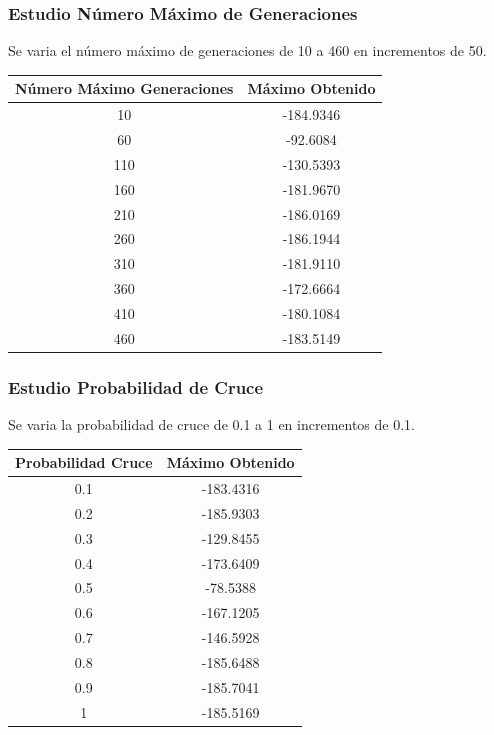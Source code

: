 \documentclass[12pt]{article}
\begin{document}
\subsubsection*{Estudio Número Máximo de Generaciones}
	Se varia el número máximo de generaciones de 10 a 460 en incrementos de 50.
\begin{table}[H]
\begin{center}
\begin{tabular}{|cc|} \hline
Número Máximo Generaciones & Máximo Obtenido \\  \hline
10  & -184.9346 \\ 
60  & -92.6084 \\ 
110 & -130.5393 \\
160 & -181.9670 \\
210 & -186.0169 \\
260 & -186.1944 \\
310 & -181.9110 \\
360 & -172.6664 \\ 
410 & -180.1084 \\
460 & -183.5149 \\  \hline
\end{tabular}
\end{center}
\end{table}
\subsubsection*{Estudio Probabilidad de Cruce}
	Se varia la probabilidad de cruce de 0.1 a 1 en incrementos de 0.1.
\begin{table}[H]
\begin{center}
\begin{tabular}{|cc|} \hline
Probabilidad Cruce & Máximo Obtenido \\  \hline
0.1 & -183.4316 \\ 
0.2 & -185.9303 \\ 
0.3 & -129.8455 \\
0.4 & -173.6409 \\
0.5 & -78.5388 \\
0.6 & -167.1205 \\
0.7 & -146.5928 \\
0.8 & -185.6488 \\ 
0.9 & -185.7041 \\
1   & -185.5169 \\  \hline
\end{tabular}
\end{center}
\end{table}
\end{document}

